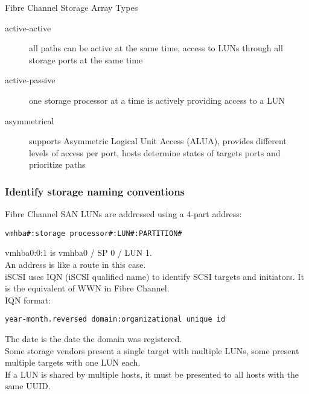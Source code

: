 Fibre Channel Storage Array Types

\begin{description}

\item[active-active]
all paths can be active at the same time, access to LUNs through all storage
ports at the same time

\item[active-passive]
one storage processor at a time is actively providing access to a LUN

\item[asymmetrical]
supports Asymmetric Logical Unit Access (ALUA), provides different levels of
access per port, hosts determine states of targets ports and prioritize paths

\end{description}

\subsubsection{Identify storage naming conventions}

Fibre Channel SAN LUNs are addressed using a 4-part address:

\begin{verbatim}
vmhba#:storage processor#:LUN#:PARTITION#
\end{verbatim}

vmhba0:0:1 is vmhba0 / SP 0 / LUN 1.\\

An address is like a route in this case.\\

iSCSI uses IQN (iSCSI qualified name) to identify SCSI targets and initiators.
It is the equivalent of WWN in Fibre Channel.\\

IQN format:\\

\begin{verbatim}
year-month.reversed domain:organizational unique id
\end{verbatim}

The date is the date the domain was registered.\\

Some storage vendors present a single target with multiple LUNs, some present
multiple targets with one LUN each.\\

If a LUN is shared by multiple hosts, it must be presented to all hosts with
the same UUID.\\

